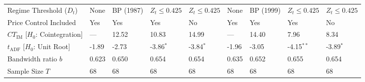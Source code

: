 \begin{table}[h!]
\begin{tabular}{p{3.5cm}p{1.35cm}p{1.35cm}p{1.35cm}p{1.35cm}p{1.35cm}p{1.35cm}p{1.35cm}p{1.35cm}}
		Regime Threshold ($D_t$) & None & BP (1987) & $Z_t \le 0.425$ & $Z_t \le 0.425$ & None & BP (1999) & $Z_t \le 0.425$ & $Z_t \le 0.425$ \\
		Price Control Included & Yes & Yes & Yes & No & Yes & Yes & Yes & No \\
		$CT_{\text{IM}}$ [$H_0$: Cointegration] & — & 12.52 & 10.83 & 14.99 & — & 14.40 & 7.96 & 8.34 \\
		$t_{\text{ADF}}$ [$H_0$: Unit Root] & -1.89 & -2.73 & -3.86$^{*}$ & -3.84$^{*}$ & -1.96 & -3.05 & -4.15$^{**}$ & -3.89$^{*}$ \\
		Bandwidth ratio $b$ & 0.623 & 0.650 & 0.654 & 0.654 & 0.635 & 0.652 & 0.655 & 0.654 \\
		Sample Size $T$ & 68 & 68 & 68 & 68 & 68 & 68 & 68 & 68 \\
		\bottomrule
	\end{tabular}
\end{table}